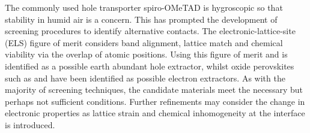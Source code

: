 The commonly used hole transporter spiro-OMeTAD is hygroscopic so that stability in humid air is a concern.\autocite{Tai2016}
This has prompted the development of screening procedures \autocite{Butler2016a, Murray2015a} to identify alternative contacts. 
The electronic-lattice-site (ELS) figure of merit considers band alignment, lattice match and chemical viability via the overlap of atomic positions.\autocite{Butler2016a}
Using this figure of merit  and is identified as a possible earth abundant hole extractor, whilst oxide perovskites such as  and  have been identified as possible electron extractors.
As with the majority of screening techniques, the candidate materials meet the necessary but perhaps not sufficient conditions. 
Further refinements may consider the change in electronic properties as lattice strain and chemical inhomogeneity at the interface is introduced.

%

